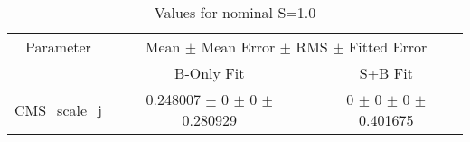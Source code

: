 \begin{table}
\centering
\caption{Values for nominal S=1.0}
\begin{tabular}{ccc}
\toprule
Parameter 	& \multicolumn{2}{c}{Mean $\pm$ Mean Error $\pm$ RMS $\pm$ Fitted Error}\\
 	& B-Only Fit & S+B Fit\\
\midrule
CMS\_scale\_j 	& \num{0.248007} $\pm$ \num{0} $\pm$ \num{0} $\pm$ \num{0.280929} 	& \num{0} $\pm$ \num{0} $\pm$ \num{0} $\pm$ \num{0.401675}\\
\bottomrule
\end{tabular}
\end{table}